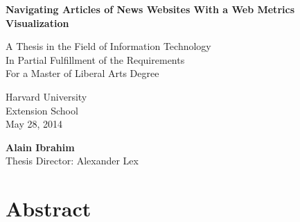 \documentclass[12pt]{article}
\begin{document}

\begin{titlepage}
    \begin{center}
        \vspace*{0.5cm}
        
        \begin{doublespace}        
        \textbf{\Large Navigating Articles of News Websites With a Web Metrics Visualization}
        \vfill


        A Thesis in the Field of Information Technology \\
        In Partial Fulfillment of the Requirements \\
        For a Master of Liberal Arts Degree
        
        \vspace{0.8cm}
        
        Harvard University \\
        Extension School \\
        May 28, 2014        
        
        \vspace{1.5cm}
        
        \textbf{Alain Ibrahim} \\
        Thesis Director: Alexander Lex \\
		\end{doublespace}        
        
        \vfill
         
    \end{center}
\end{titlepage}

\tableofcontents

\vfill


\section{Abstract}
\end{document}
